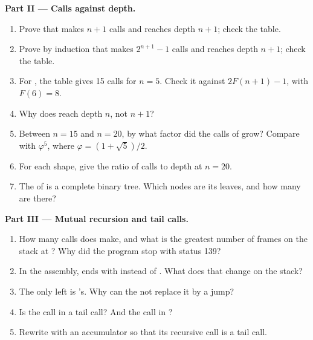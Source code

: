 \begin{problem}
\medskip\noindent\textbf{Part II --- Calls against depth.}
\begin{enumerate}[resume]
\item Prove that  makes $n + 1$ calls and reaches depth $n + 1$; check the table.
\item Prove by induction that  makes $2^{n+1} - 1$ calls and reaches depth $n + 1$; check the
table.
\item For , the table gives 15 calls for $n = 5$. Check it against $2F(n+1) - 1$, with $F(6) = 8$.
\item Why does  reach depth $n$, not $n + 1$?
\item Between $n = 15$ and $n = 20$, by what factor did the calls of  grow? Compare with
$\varphi^5$, where $\varphi = (1 + \sqrt 5)/2$.
\item For each shape, give the ratio of calls to depth at $n = 20$.
\item The  of  is a complete binary tree. Which nodes are its leaves, and how
many are there?
\end{enumerate}

\medskip\noindent\textbf{Part III --- Mutual recursion and tail calls.}
\begin{enumerate}[resume]
\item How many calls does  make, and what is the greatest number of frames on the stack at
? Why did the  program stop with status 139?
\item In the  assembly,  ends with  instead of . What
does that change on the stack?
\item The only  left is 's. Why can the  not replace it by a jump?
\item Is the call  in  a tail call? And the call
 in ?
\item Rewrite  with an accumulator so that its recursive call is a tail call.
\end{enumerate}


\end{problem}
